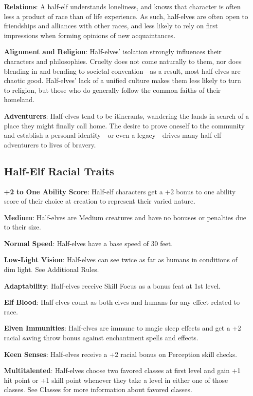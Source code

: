 \textbf{Relations}: A half-elf understands loneliness, and knows that character is often less a product of race than of life experience. As such, half-elves are often open to friendships and alliances with other races, and less likely to rely on first impressions when forming opinions of new acquaintances.
				
\textbf{Alignment and Religion}: Half-elves' isolation strongly influences their characters and philosophies. Cruelty does not come naturally to them, nor does blending in and bending to societal convention---as a result, most half-elves are chaotic good. Half-elves' lack of a unified culture makes them less likely to turn to religion, but those who do generally follow the common faiths of their homeland.
				
\textbf{Adventurers}: Half-elves tend to be itinerants, wandering the lands in search of a place they might finally call home. The desire to prove oneself to the community and establish a personal identity---or even a legacy---drives many half-elf adventurers to lives of bravery.
											
\subsection{Half-Elf Racial Traits}

				
\textbf{+2 to One Ability Score}: Half-elf characters get a +2 bonus to one ability score of their choice at creation to represent their varied nature.
				
\textbf{Medium}: Half-elves are Medium creatures and have no bonuses or penalties due to their size.
				
\textbf{Normal Speed}: Half-elves have a base speed of 30 feet.
				
\textbf{Low-Light Vision}: Half-elves can see twice as far as humans in conditions of dim light. See Additional Rules.
				
\textbf{Adaptability}: Half-elves receive Skill Focus as a bonus feat at 1st level.
				
\textbf{Elf Blood}: Half-elves count as both elves and humans for any effect related to race.
				
\textbf{Elven Immunities}: Half-elves are immune to magic sleep effects and get a +2 racial saving throw bonus against enchantment spells and effects.
				
\textbf{Keen Senses}: Half-elves receive a +2 racial bonus on Perception skill checks.
				
\textbf{Multitalented}: Half-elves choose two favored classes at first level and gain +1 hit point or +1 skill point whenever they take a level in either one of those classes. See Classes for more information about favored classes. 
				
